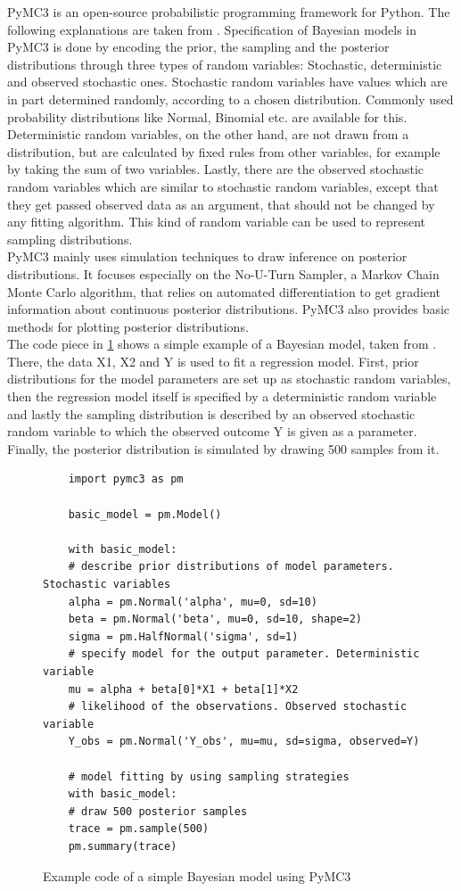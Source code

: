 \documentclass{article}
\begin{document}
PyMC3 is an open-source probabilistic programming framework for Python. The following explanations are taken from \cite{Salvatier2016}. Specification of Bayesian models in PyMC3 is done by encoding the prior, the sampling and the posterior distributions through three types of random variables: Stochastic, deterministic and observed stochastic ones. Stochastic random variables have values which are in part determined randomly, according to a chosen distribution. Commonly used probability distributions like Normal, Binomial etc. are available for this. Deterministic random variables, on the other hand, are not drawn from a distribution, but are calculated by fixed rules from other variables, for example by taking the sum of two variables. Lastly, there are the observed stochastic random variables which are similar to stochastic random variables, except that they get passed observed data as an argument, that should not be changed by any fitting algorithm.  This kind of random variable can be used to represent sampling distributions.
\\
PyMC3 mainly uses simulation techniques to draw inference on posterior distributions. It focuses especially on the No-U-Turn Sampler, a Markov Chain Monte Carlo algorithm, that relies on automated differentiation to get gradient information about continuous posterior distributions. PyMC3 also provides basic methods for plotting posterior distributions.
\\
The code piece  in \ref{fig:pymc3_example_code} shows a simple example of a Bayesian model, taken from \cite{Salvatier2016}. There, the data X1, X2 and Y is used to fit a regression model. First, prior distributions for the model parameters are set up as stochastic random variables, then the regression model itself is specified by a deterministic random variable and lastly the sampling distribution is described by an observed stochastic random variable to which the observed outcome Y is given as a parameter. Finally, the posterior distribution is simulated by drawing 500 samples from it.

\begin{figure}
	\begin{lstlisting}
	import pymc3 as pm
	
	basic_model = pm.Model()
	
	with basic_model:
	# describe prior distributions of model parameters. Stochastic variables
	alpha = pm.Normal('alpha', mu=0, sd=10)
	beta = pm.Normal('beta', mu=0, sd=10, shape=2)
	sigma = pm.HalfNormal('sigma', sd=1)
	# specify model for the output parameter. Deterministic variable
	mu = alpha + beta[0]*X1 + beta[1]*X2
	# likelihood of the observations. Observed stochastic variable
	Y_obs = pm.Normal('Y_obs', mu=mu, sd=sigma, observed=Y)
	
	# model fitting by using sampling strategies   
	with basic_model:
	# draw 500 posterior samples
	trace = pm.sample(500)
	pm.summary(trace)
	\end{lstlisting}
	\label{fig:pymc3_example_code}
	\caption[Example code of a simple Bayesian model using PyMC3]{Example code of a simple Bayesian model using PyMC3}
\end{figure}
\end{document}
